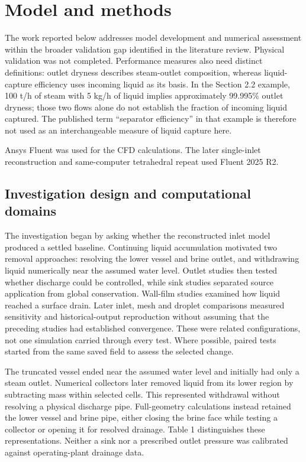 \section{Model and methods}

The work reported below addresses model development and numerical assessment within the broader validation gap identified in the literature review. Physical validation was not completed. Performance measures also need distinct definitions: outlet dryness describes steam-outlet composition, whereas liquid-capture efficiency uses incoming liquid as its basis. In the Section 2.2 example, 100 t/h of steam with 5 kg/h of liquid implies approximately 99.995\% outlet dryness; those two flows alone do not establish the fraction of incoming liquid captured. The published term ``separator efficiency'' in that example is therefore not used as an interchangeable measure of liquid capture here.

Ansys Fluent was used for the CFD calculations. The later single-inlet reconstruction and same-computer tetrahedral repeat used Fluent 2025 R2.

\subsection{Investigation design and computational domains}

The investigation began by asking whether the reconstructed inlet model produced a settled baseline. Continuing liquid accumulation motivated two removal approaches: resolving the lower vessel and brine outlet, and withdrawing liquid numerically near the assumed water level. Outlet studies then tested whether discharge could be controlled, while sink studies separated source application from global conservation. Wall-film studies examined how liquid reached a surface drain. Later inlet, mesh and droplet comparisons measured sensitivity and historical-output reproduction without assuming that the preceding studies had established convergence. These were related configurations, not one simulation carried through every test. Where possible, paired tests started from the same saved field to assess the selected change.

The truncated vessel ended near the assumed water level and initially had only a steam outlet. Numerical collectors later removed liquid from its lower region by subtracting mass within selected cells. This represented withdrawal without resolving a physical discharge pipe. Full-geometry calculations instead retained the lower vessel and brine pipe, either closing the brine face while testing a collector or opening it for resolved drainage. Table 1 distinguishes these representations. Neither a sink nor a prescribed outlet pressure was calibrated against operating-plant drainage data.

